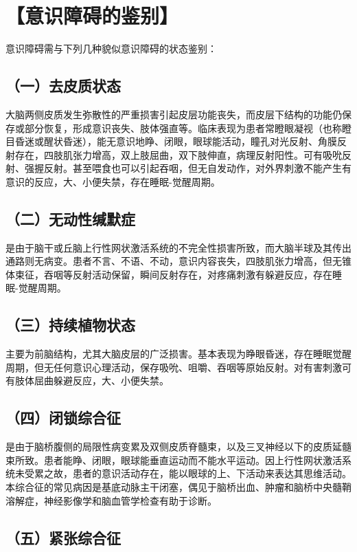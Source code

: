 \section{【意识障碍的鉴别】}

意识障碍需与下列几种貌似意识障碍的状态鉴别：

\subsection{（一）去皮质状态}

大脑两侧皮质发生弥散性的严重损害引起皮层功能丧失，而皮层下结构的功能仍保存或部分恢复，形成意识丧失、肢体强直等。临床表现为患者常瞪眼凝视（也称瞪目昏迷或醒状昏迷），能无意识地睁、闭眼，眼球能活动，瞳孔对光反射、角膜反射存在，四肢肌张力增高，双上肢屈曲，双下肢伸直，病理反射阳性。可有吸吮反射、强握反射。甚至喂食也可以引起吞咽，但无自发动作，对外界刺激不能产生有意识的反应，大、小便失禁，存在睡眠-觉醒周期。

\subsection{（二）无动性缄默症}

是由于脑干或丘脑上行性网状激活系统的不完全性损害所致，而大脑半球及其传出通路则无病变。患者不言、不语、不动，意识内容丧失，四肢肌张力增高，但无锥体束征，吞咽等反射活动保留，瞬间反射存在，对疼痛刺激有躲避反应，存在睡眠-觉醒周期。

\subsection{（三）持续植物状态}

主要为前脑结构，尤其大脑皮层的广泛损害。基本表现为睁眼昏迷，存在睡眠觉醒周期，但无任何意识心理活动，保存吸吮、咀嚼、吞咽等原始反射。对有害刺激可有肢体屈曲躲避反应，大、小便失禁。

\subsection{（四）闭锁综合征}

是由于脑桥腹侧的局限性病变累及双侧皮质脊髓束，以及三叉神经以下的皮质延髓束所致。患者能睁、闭眼，眼球能垂直运动而不能水平运动。因上行性网状激活系统未受累之故，患者的意识活动存在，能以眼球的上、下活动来表达其思维活动。本综合征的常见病因是基底动脉主干闭塞，偶见于脑桥出血、肿瘤和脑桥中央髓鞘溶解症，神经影像学和脑血管学检查有助于诊断。

\subsection{（五）紧张综合征}

